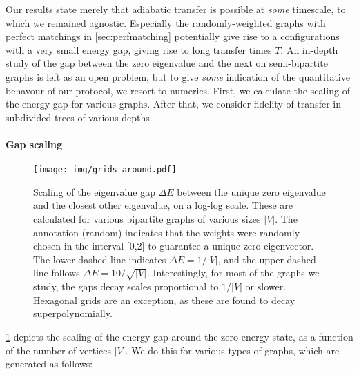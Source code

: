 Our results state merely that adiabatic transfer is possible at \emph{some} timescale, to which we remained agnostic. Especially the randomly-weighted graphs with perfect matchings in \cref{sec:perfmatching} potentially give rise to a configurations with a very small energy gap, giving rise to long transfer times $T$. An in-depth study of the gap between the zero eigenvalue and the next on semi-bipartite graphs is left as an open problem, but to give \emph{some} indication of the quantitative behavour of our protocol, we resort to numerics. First, we calculate the scaling of the energy gap for various graphs. After that, we consider fidelity of transfer in subdivided trees of various depths. 


\paragraph{Gap scaling} 
%
%
\begin{figure}
\centering
\texttt{[image: img/grids\_around.pdf]}
\caption{Scaling of the eigenvalue gap $\Delta E$ between the unique zero eigenvalue and the closest other eigenvalue, on a log-log scale. These are calculated for various bipartite graphs of various sizes $|V|$. The annotation (random) indicates that the weights were randomly chosen in the interval [0,2] to guarantee a unique zero eigenvector. The lower dashed line indicates $\Delta E = 1/|V|$, and the upper dashed line follows $\Delta E = 10/\sqrt{|V|}$. Interestingly, for most of the graphs we study, the gaps decay scales proportional to $1/|V|$ or slower. Hexagonal grids are an exception, as these are found to decay superpolynomially. }
%
\label{fig:gapscaling}
\end{figure}
%
%
\cref{fig:gapscaling} depicts the scaling of the energy gap around the zero energy state, as a function of the number of vertices $|V|$. We do this for various types of graphs, which are generated as follows:
